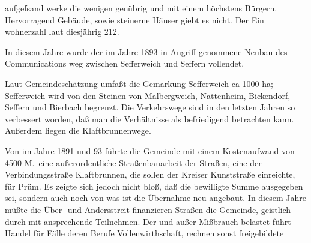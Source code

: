 

aufgefsand werke die wenigen genübrig und mit\ob
einem höchstens Bürgern. Hervorragend Gebäude,\ob
sowie steinerne Häuser giebt es nicht. Der Ein\ohb
{}%
wohnerzahl laut diesjährig 212.

In diesem Jahre wurde der im Jahre 1893 in Angriff\ob
genommene Neubau des Communications\ohb
weg zwischen Sefferweich und Seffern vollendet.

%
Laut Gemeindeschätzung umfaßt die Gemarkung\ob
Sefferweich ca 1000 ha; Sefferweich wird von den\ob
Steinen von Malbergweich, Nattenheim, Bickendorf,\ob
Seffern und Bierbach begrenzt. Die Verkehrswege\ob
sind in den letzten Jahren so verbessert worden, daß\ob
man die Verhältnisse als befriedigend betrachten\ob
kann. Außerdem liegen die Klaftbrunnenwege.

Von im Jahre 1891 und 93 führte die Gemeinde\ob
mit einem Kostenaufwand von 4500 M.\ eine\ob
außerordentliche Straßenbauarbeit der Straßen, eine\ob
der Verbindungsstraße Klaftbrunnen, die sollen der Kreiser\ob
{}%
Kunststraße einreichte, für Prüm. Es zeigte sich jedoch\ob
nicht bloß, daß die bewilligte Summe ausgegeben\ob
sei, sondern auch noch von was ist die Übernahme neu\ob
angebaut. In diesem Jahre müßte die Über- und\ob
Andersstreit finanzieren Straßen die Gemeinde,\ob
geistlich durch mit ansprechende Teilnehmen. Der und\ob
außer Mißbrauch belastet führt Handel für Fälle\ob
deren Berufe Vollenwirthschaft, rechnen sonst freigebildete
\pend
